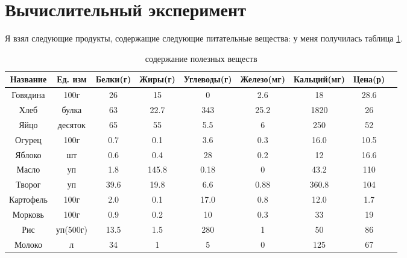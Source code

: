 \documentclass[]{article}
\begin{document}
\section{Вычислительный эксперимент}
Я взял следующие продукты, содержащие следующие питательные вещества:
у меня получилась таблица \ref{tab:1}.
\begin{table}\caption{содержание полезных веществ}\label{tab:1}
\centering
\begin{tabular}{|c|c|c|c|c|c|c|c|c|}
\hline
Название & Ед. изм & Белки(г) & Жиры(г) & Углеводы(г) & Железо(мг) & Кальций(мг) & Цена(р)\\
\hline
Говядина & 100г & 26 & 15 & 0 & 2.6 & 18 & 28.6\\
\hline
Хлеб & булка & 63 & 22.7& 343 & 25.2 & 1820 & 26\\
\hline
Яйцо & десяток & 65 & 55 & 5.5 & 6 & 250 & 52\\
\hline
Огурец & 100г & 0.7 & 0.1 & 3.6 & 0.3 & 16.0 & 10.5\\
\hline
Яблоко & шт & 0.6 & 0.4 & 28 & 0.2 & 12 & 16.6\\
\hline
Масло & уп & 1.8 & 145.8 & 0.18 & 0 & 43.2 & 110\\
\hline
Творог & уп & 39.6 & 19.8 & 6.6 & 0.88 & 360.8 & 104\\
\hline
Картофель & 100г & 2.0 & 0.1 & 17.0 & 0.8 & 12.0 & 1.7\\
\hline
Морковь & 100г & 0.9 & 0.2 & 10 & 0.3 & 33 & 19\\
\hline
Рис & уп(500г) & 13.5 & 1.5 & 280 & 1 & 50 &86\\
\hline
Молоко & л & 34 & 1 & 5 & 0 &125 & 67\\
\hline
\end{tabular}
\end{table}
\end{document}

